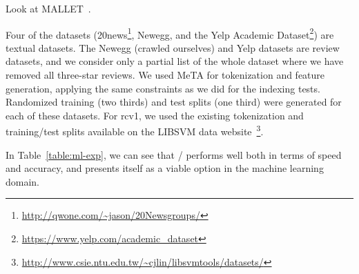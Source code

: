 Look at MALLET~\cite{mallet}.

Four of the datasets
(20news\footnote{\url{http://qwone.com/~jason/20Newsgroups/}}, Newegg, and the
Yelp Academic Dataset\footnote{\url{https://www.yelp.com/academic_dataset}}) are
textual datasets. The Newegg (crawled ourselves) and Yelp datasets are review
datasets, and we consider only a partial list of the whole dataset where we have
removed all three-star reviews. We used MeTA for tokenization and feature
generation, applying the same constraints as we did for the indexing tests.
Randomized training (two thirds) and test splits (one third) were generated for
each of these datasets. For rcv1, we used the existing tokenization and
training/test splits available on the LIBSVM data
website~\footnote{\url{http://www.csie.ntu.edu.tw/~cjlin/libsvmtools/datasets/}}.

In Table~\ref{table:ml-exp}, we can see that \meta/ performs well both in
terms of speed and accuracy, and presents itself as a viable option in the
machine learning domain.



